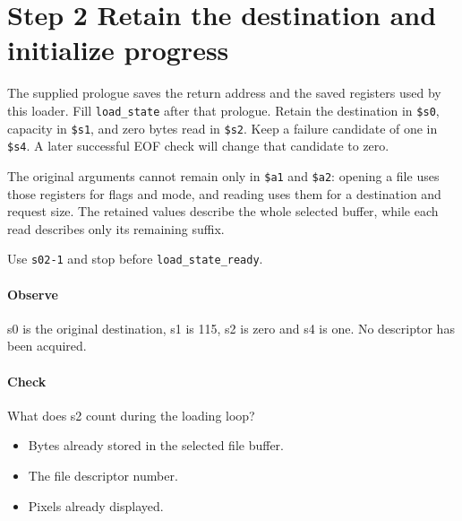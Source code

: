 \section{Step 2 Retain the destination and initialize progress}\label{png-load-s02}
The supplied prologue saves the return address and the saved registers used by this loader. Fill \texttt{load\_state} after that prologue. Retain the destination in \texttt{\$s0}, capacity in \texttt{\$s1}, and zero bytes read in \texttt{\$s2}. Keep a failure candidate of one in \texttt{\$s4}. A later successful EOF check will change that candidate to zero.

The original arguments cannot remain only in \texttt{\$a1} and \texttt{\$a2}: opening a file uses those registers for flags and mode, and reading uses them for a destination and request size. The retained values describe the whole selected buffer, while each read describes only its remaining suffix.

Use \texttt{s02-1} and stop before \texttt{load\_state\_ready}.

\paragraph{Observe} s0 is the original destination, s1 is 115, s2 is zero and s4 is one. No descriptor has been acquired.

\paragraph{Check} What does s2 count during the loading loop?
\begin{itemize}
  \item[A.] Bytes already stored in the selected file buffer.
  \item[B.] The file descriptor number.
  \item[C.] Pixels already displayed.
\end{itemize}
